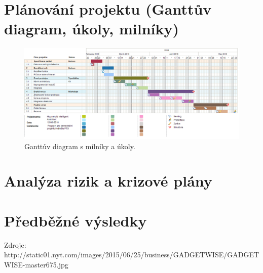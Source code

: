 \documentclass[12pt,a4paper]{article}
\begin{document}
\section*{Plánování projektu (Ganttův diagram, úkoly, milníky)}
\begin{landscape}
\begin{figure}[ht!]
	\begin{center}
	\includegraphics[height = 0.6\textheight ]{PTO-Gantt.png}
	\caption{Ganttův diagram s milníky a úkoly.}
	\label{fig:diagram api}
	\end{center}
\end{figure}
\end{landscape}

\section*{Analýza rizik a krizové plány}

\section*{Předběžné výsledky}

Zdroje:
http://static01.nyt.com/images/2015/06/25/business/GADGETWISE/GADGETWISE-master675.jpg
\end{document}
